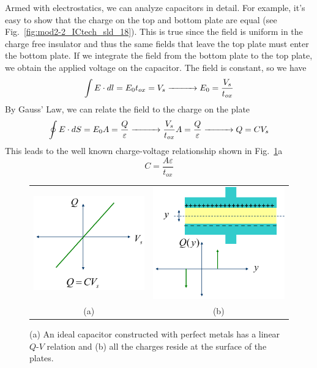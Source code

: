 Armed with electrostatics, we can analyze capacitors in detail.  For example, it's easy to show that the charge on the top and bottom plate are equal (see Fig.~\ref{fig:mod2-2_ICtech_sld_18}).  This is true since the field is uniform in the charge free insulator and thus the same fields that leave the top plate must enter the bottom plate.
%
If we integrate the field from the bottom plate to the top plate, we obtain the applied voltage on the capacitor.  The field is constant, so we have
\begin{equation} 
	\int {E \cdot dl}  = {E_0}{t_{ox}} = {V_s}  \xrightarrow{\hspace*{1cm}}
	{E_0} = \frac{{{V_s}}}{{{t_{ox}}}} 
\end{equation}
By Gauss' Law, we can relate the field to the charge on the plate
\begin{equation} 
	\oint {E \cdot dS = {E_0}A = \frac{Q}{\varepsilon }}  \xrightarrow{\hspace*{1cm}}
	\frac{{{V_s}}}{{{t_{ox}}}}A = \frac{Q}{\varepsilon } \xrightarrow{\hspace*{1cm}}
	Q = C{V_s}
\end{equation}
This leads to the well known charge-voltage relationship shown in Fig.~\ref{fig:mod2-2_ICtech_sld_19}a
\begin{equation} 
	C = \frac{{A\varepsilon }}{{{t_{ox}}}}
\end{equation}
\begin{figure}[tb]
\begin{center}
\begin{tabular}{cc}
\includegraphics[width=.35\columnwidth]{mod2-2_ICtech_sld_19} &
\includegraphics[width=.35\columnwidth]{mod2-2_ICtech_sld_19b} \\
(a) & (b) \\
\end{tabular}
\end{center}
\caption{(a) An ideal capacitor constructed with perfect metals has a linear $Q$-$V$ relation and (b) all the charges reside at the surface of the plates.}
\label{fig:mod2-2_ICtech_sld_19}
\end{figure}

